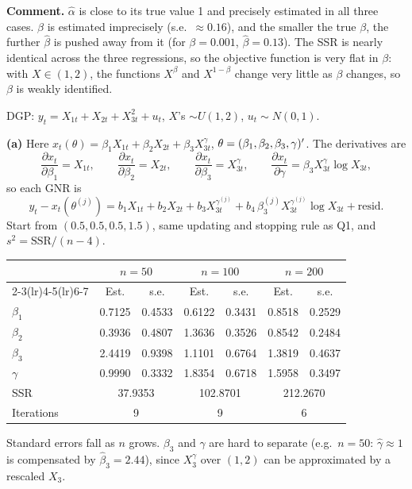 \documentclass[11pt]{article}
\begin{document}
\textbf{Comment.} $\hat\alpha$ is close to its true value 1 and precisely estimated in all three cases.
$\beta$ is estimated imprecisely (s.e.\ $\approx 0.16$), and the smaller the true $\beta$, the further
$\hat\beta$ is pushed away from it (for $\beta=0.001$, $\hat\beta=0.13$). The SSR is nearly identical across
the three regressions, so the objective function is very flat in $\beta$: with $X\in(1,2)$, the
functions $X^{\beta}$ and $X^{1-\beta}$ change very little as $\beta$ changes, so $\beta$ is weakly identified.

DGP: $y_t=X_{1t}+X_{2t}+X_{3t}^{2}+u_t$, $X$'s $\sim U(1,2)$, $u_t\sim N(0,1)$.

\textbf{(a)} Here $x_t(\theta)=\beta_1X_{1t}+\beta_2X_{2t}+\beta_3X_{3t}^{\gamma}$, $\theta=(\beta_1,\beta_2,\beta_3,\gamma)^{\prime}$. The derivatives are
\[
  \frac{\partial x_t}{\partial\beta_1}=X_{1t},\qquad
  \frac{\partial x_t}{\partial\beta_2}=X_{2t},\qquad
  \frac{\partial x_t}{\partial\beta_3}=X_{3t}^{\gamma},\qquad
  \frac{\partial x_t}{\partial\gamma}=\beta_3X_{3t}^{\gamma}\log X_{3t},
\]
so each GNR is
\[
  y_t-x_t(\theta^{(j)})=b_1X_{1t}+b_2X_{2t}+b_3X_{3t}^{\gamma^{(j)}}+b_4\,\beta_3^{(j)}X_{3t}^{\gamma^{(j)}}\log X_{3t}+\text{resid}.
\]
Start from $(0.5,0.5,0.5,1.5)$, same updating and stopping rule as Q1, and $s^2=\text{SSR}/(n-4)$.

\begin{center}
\begin{tabular}{lcccccc}
\toprule
 & \multicolumn{2}{c}{$n=50$} & \multicolumn{2}{c}{$n=100$} & \multicolumn{2}{c}{$n=200$} \\
\cmidrule(lr){2-3}\cmidrule(lr){4-5}\cmidrule(lr){6-7}
 & Est. & s.e. & Est. & s.e. & Est. & s.e. \\
\midrule
$\beta_1$ & 0.7125 & 0.4533 & 0.6122 & 0.3431 & 0.8518 & 0.2529 \\
$\beta_2$ & 0.3936 & 0.4807 & 1.3636 & 0.3526 & 0.8542 & 0.2484 \\
$\beta_3$ & 2.4419 & 0.9398 & 1.1101 & 0.6764 & 1.3819 & 0.4637 \\
$\gamma$  & 0.9990 & 0.3332 & 1.8354 & 0.6718 & 1.5958 & 0.3497 \\
\midrule
SSR & \multicolumn{2}{c}{37.9353} & \multicolumn{2}{c}{102.8701} & \multicolumn{2}{c}{212.2670} \\
Iterations & \multicolumn{2}{c}{9} & \multicolumn{2}{c}{9} & \multicolumn{2}{c}{6} \\
\bottomrule
\end{tabular}
\end{center}
Standard errors fall as $n$ grows. $\beta_3$ and $\gamma$ are hard to separate (e.g.\ $n=50$: $\hat\gamma\approx1$
is compensated by $\hat\beta_3=2.44$), since $X_3^{\gamma}$ over $(1,2)$ can be approximated by a rescaled $X_3$.
\end{document}
